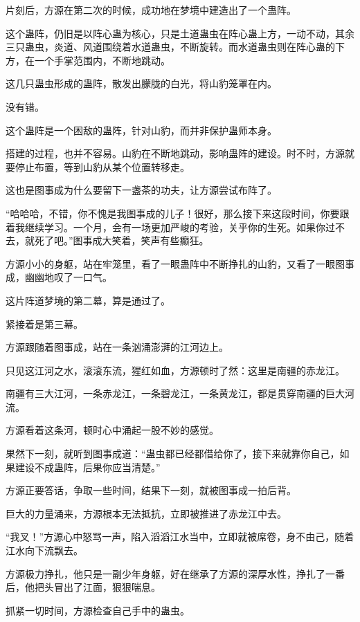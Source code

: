 
\begin{this_body}

片刻后，方源在第二次的时候，成功地在梦境中建造出了一个蛊阵。

这个蛊阵，仍旧是以阵心蛊为核心，只是土道蛊虫在阵心蛊上方，一动不动，其余三只蛊虫，炎道、风道围绕着水道蛊虫，不断旋转。而水道蛊虫则在阵心蛊的下方，在一个手掌范围内，不断地跳动。

这几只蛊虫形成的蛊阵，散发出朦胧的白光，将山豹笼罩在内。

没有错。

这个蛊阵是一个困敌的蛊阵，针对山豹，而并非保护蛊师本身。

搭建的过程，也并不容易。山豹在不断地跳动，影响蛊阵的建设。时不时，方源就要停止布置，等到山豹从某个位置转移走。

这也是图事成为什么要留下一盏茶的功夫，让方源尝试布阵了。

“哈哈哈，不错，你不愧是我图事成的儿子！很好，那么接下来这段时间，你要跟着我继续学习。一个月，会有一场更加严峻的考验，关乎你的生死。如果你过不去，就死了吧。”图事成大笑着，笑声有些癫狂。

方源小小的身躯，站在牢笼里，看了一眼蛊阵中不断挣扎的山豹，又看了一眼图事成，幽幽地叹了一口气。

这片阵道梦境的第二幕，算是通过了。

紧接着是第三幕。

方源跟随着图事成，站在一条汹涌澎湃的江河边上。

只见这江河之水，滚滚东流，猩红如血，方源顿时了然：这里是南疆的赤龙江。

南疆有三大江河，一条赤龙江，一条碧龙江，一条黄龙江，都是贯穿南疆的巨大河流。

方源看着这条河，顿时心中涌起一股不妙的感觉。

果然下一刻，就听到图事成道：“蛊虫都已经都借给你了，接下来就靠你自己，如果建设不成蛊阵，后果你应当清楚。”

方源正要答话，争取一些时间，结果下一刻，就被图事成一拍后背。

巨大的力量涌来，方源根本无法抵抗，立即被推进了赤龙江中去。

“我叉！”方源心中怒骂一声，陷入滔滔江水当中，立即就被席卷，身不由己，随着江水向下流飘去。

方源极力挣扎，他只是一副少年身躯，好在继承了方源的深厚水性，挣扎了一番后，他把头冒出了江面，狠狠喘息。

抓紧一切时间，方源检查自己手中的蛊虫。


\end{this_body}
